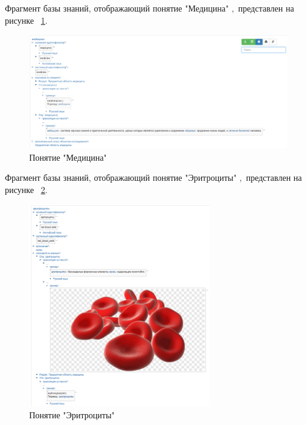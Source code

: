 Фрагмент базы знаний, отображающий  понятие "Медицина" \cite{bme}$,$ представлен на рисунке
~\ref{fig:sections/concept_medicine}.
\begin{figure}[H]
	\centering
	\includegraphics[width=1.0\textwidth]{sections/concept_medicine.png}
	\caption{Понятие "Медицина"}
	\label{fig:sections/concept_medicine}
\end{figure}

Фрагмент базы знаний, отображающий  понятие "Эритроциты" \cite{bme}$,$ представлен на рисунке
~\ref{fig:sections/red_blood_cells}.
\begin{figure}[H]
	\centering
	\includegraphics[width=0.7\textwidth]{sections/red_blood_cells.png}
	\caption{Понятие "Эритроциты"}
	\label{fig:sections/red_blood_cells}
\end{figure}


